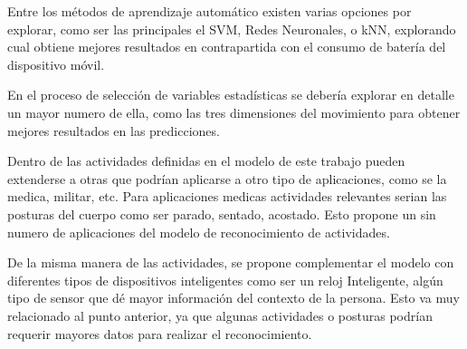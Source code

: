 Entre los métodos de aprendizaje automático existen varias opciones
por explorar, como ser las principales el SVM, Redes Neuronales, o
kNN, explorando cual obtiene mejores resultados en contrapartida con
el consumo de batería del dispositivo móvil.

En el proceso de selección de variables estadísticas se debería explorar
en detalle un mayor numero de ella, como las tres dimensiones del
movimiento para obtener mejores resultados en las predicciones. 

Dentro de las actividades definidas en el modelo de este trabajo pueden
extenderse a otras que podrían aplicarse a otro tipo de aplicaciones,
como se la medica, militar, etc. Para aplicaciones medicas actividades
relevantes serian las posturas del cuerpo como ser parado, sentado,
acostado. Esto propone un sin numero de aplicaciones del modelo de
reconocimiento de actividades. 

De la misma manera de las actividades, se propone complementar el
modelo con diferentes tipos de dispositivos inteligentes como ser
un reloj Inteligente, algún tipo de sensor que dé mayor información
del contexto de la persona. Esto va muy relacionado al punto anterior,
ya que algunas actividades o posturas podrían requerir mayores datos
para realizar el reconocimiento.
